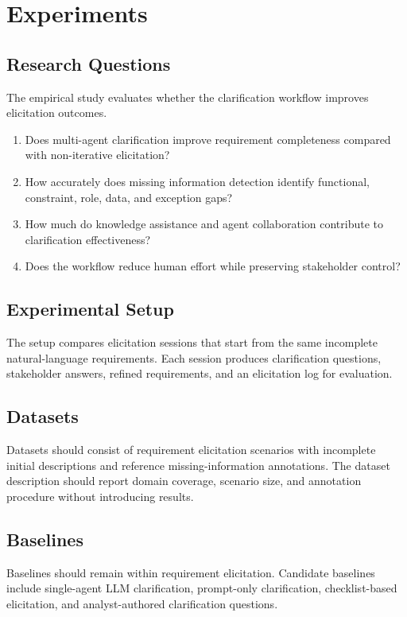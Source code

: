 \section{Experiments}
\label{experiments}

\subsection{Research Questions}
The empirical study evaluates whether the clarification workflow improves elicitation outcomes.
\begin{enumerate}[label=\textbf{RQ\arabic*:}, leftmargin=*]
  \item Does multi-agent clarification improve requirement completeness compared with non-iterative elicitation?
  \item How accurately does missing information detection identify functional, constraint, role, data, and exception gaps?
  \item How much do knowledge assistance and agent collaboration contribute to clarification effectiveness?
  \item Does the workflow reduce human effort while preserving stakeholder control?
\end{enumerate}

\subsection{Experimental Setup}
The setup compares elicitation sessions that start from the same incomplete natural-language requirements.
Each session produces clarification questions, stakeholder answers, refined requirements, and an elicitation log for evaluation.

\subsection{Datasets}
Datasets should consist of requirement elicitation scenarios with incomplete initial descriptions and reference missing-information annotations.
The dataset description should report domain coverage, scenario size, and annotation procedure without introducing results.

\subsection{Baselines}
Baselines should remain within requirement elicitation.
Candidate baselines include single-agent LLM clarification, prompt-only clarification, checklist-based elicitation, and analyst-authored clarification questions.

